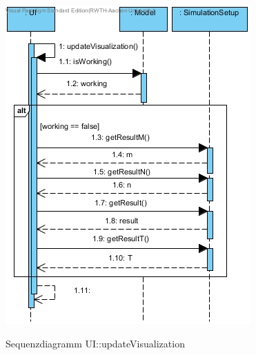 \begin{figure}[H]
	\centering
	\includegraphics[scale=.6]{Bilder/UI__updateVisualization().jpg}\\
	\caption{Sequenzdiagramm UI::updateVisualization}
	\label{Sequenzdiagramm UI::updateVisualization}
\end{figure}